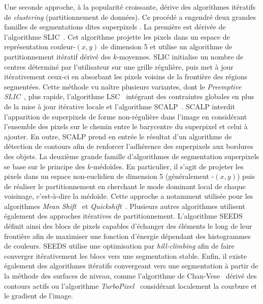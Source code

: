 Une seconde approche, à la popularité croissante, dérive des algorithmes itératifs de \emph{clustering} (partitionnement de données). Ce procédé a engendré deux grandes familles de segmentations dites \og superpixels \fg. La première est dérivée de l'algorithme \gls{SLIC}~\cite{achanta_slic_2010}. Cet algorithme projette les pixels dans un espace de représentation couleur-$(x,y)$ de dimension 5 et utilise un algorithme de partitionnement itératif dérivé des $k$-moyennes. \gls{SLIC} initialise un nombre de centres déterminé par l'utilisateur sur une grille régulière, puis met à jour itérativement ceux-ci en absorbant les pixels voisins de la frontière des régions segmentées. Cette méthode vu naître plusieurs variantes, dont le \emph{Preemptive SLIC}~\cite{neubert_compact_2014}, plus rapide, l'algorithme \gls{LSC}~\cite{li_superpixel_2015} intégrant des contraintes globales en plus de la mise à jour itérative locale et l'algorithme \gls{SCALP}~\cite{giraud_robust_2018}. \gls{SCALP} interdit l'apparition de superpixels de forme non-régulière dans l'image en considérant l'ensemble des pixels sur le chemin entre le barycentre du superpixel et celui à ajouter. En outre, \gls{SCALP} prend en entrée le résultat d'un algorithme de détection de contours afin de renforcer l'adhérence des superpixels aux bordures des objets.
La deuxième grande famille d'algorithmes de segmentation superpixels se base sur le principe des $k$-médoïdes. En particulier, il s'agit de projeter les pixels dans un espace non-euclidien de dimension 5 (généralement -$(x,y)$) puis de réaliser le partitionnement en cherchant le mode dominant local de chaque voisinage, c'est-à-dire la médoïde. Cette approche a notamment utilisée pour les algorithmes \emph{Mean Shift}~\cite{comaniciu_mean_2002} et \emph{Quickshift}~\cite{vedaldi_quick_2008}.
Plusieurs autres algorithmes utilisent également des approches itératives de partitionnement. L'algorithme \gls{SEEDS}~\cite{van_den_bergh_seeds_2012} définit ainsi des blocs de pixels capables d'échanger des éléments le long de leur frontière afin de maximiser une fonction d'énergie dépendant des histogrammes de couleurs. \gls{SEEDS} utilise une optimisation par \emph{hill-climbing} afin de faire converger itérativement les blocs vers une segmentation stable. Enfin, il existe également des algorithmes itératifs convergeant vers une segmentation à partir de la méthode des surfaces de niveau, comme l'algorithme de Chan-Vese~\cite{chan_active_1999} dérivé des contours actifs ou l'algorithme \emph{TurboPixel}~\cite{levinshtein_turbopixels_2009} considérant localement la courbure et le gradient de l'image.

